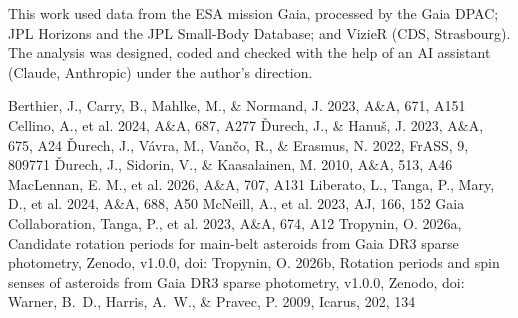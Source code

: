 \documentclass[RNAAS]{aastex631}
\begin{document}
\begin{acknowledgments}
This work used data from the ESA mission Gaia, processed by the Gaia DPAC; JPL Horizons and the JPL
Small-Body Database; and VizieR (CDS, Strasbourg). The analysis was designed, coded and checked with the
help of an AI assistant (Claude, Anthropic) under the author's direction.
\end{acknowledgments}

\begin{thebibliography}{}
 Berthier, J., Carry, B., Mahlke, M., \& Normand, J. 2023, A\&A, 671, A151
 Cellino, A., et al. 2024, A\&A, 687, A277
 \v{D}urech, J., \& Hanu\v{s}, J. 2023, A\&A, 675, A24
 \v{D}urech, J., V\'avra, M., Van\v{c}o, R., \& Erasmus, N. 2022, FrASS, 9, 809771
 \v{D}urech, J., Sidorin, V., \& Kaasalainen, M. 2010, A\&A, 513, A46
 MacLennan, E. M., et al. 2026, A\&A, 707, A131
 Liberato, L., Tanga, P., Mary, D., et al. 2024, A\&A, 688, A50
 McNeill, A., et al. 2023, AJ, 166, 152
 Gaia Collaboration, Tanga, P., et al. 2023, A\&A, 674, A12
 Tropynin, O. 2026a, Candidate rotation periods for main-belt asteroids from Gaia DR3 sparse photometry, Zenodo, v1.0.0, doi:
 Tropynin, O. 2026b, Rotation periods and spin senses of asteroids from Gaia DR3 sparse photometry, v1.0.0, Zenodo, doi:
 Warner, B.~D., Harris, A.~W., \& Pravec, P. 2009, Icarus, 202, 134
\end{thebibliography}
\end{document}

